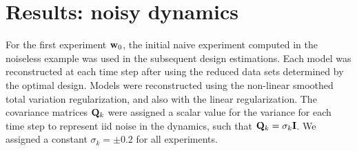 \documentclass[leqno,onefignum,onetabnum]{siamltexmm}
\newcommand{\bfI}	{{\bf{I}}}
\newcommand{\bfQ}	{{\bf{Q}}}
\newcommand{\bfm}	{{\bf{m}}}
\newcommand{\bfw}	{{\bf{w}}}
\begin{document}


\section{Results: noisy  dynamics}
\label{sec: Example2}
For the first experiment $\bfw_0$, the initial naive experiment computed in the noiseless example was used in the subsequent design estimations. Each model was reconstructed at each time step after using the reduced data sets determined by the optimal design. Models were reconstructed using the non-linear smoothed total variation regularization, and also with the linear regularization. 
The covariance matrices $\bfQ_k$ were assigned a scalar value for the variance for each time step to represent iid noise in the dynamics, such that $\bfQ_k = \sigma_k \bfI$. We assigned a constant $\sigma_k = \pm 0.2$ for all experiments. 
\end{document}
